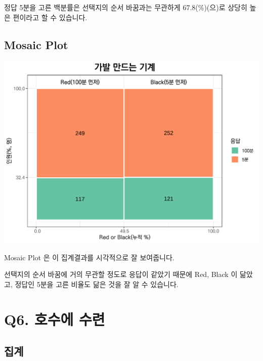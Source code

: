 \documentclass[
]{book}
\begin{document}
정답 5분을 고른 백분률은 선택지의 순서 바꿈과는 무관하게 67.8(\%)(으)로 상당히 높은 편이라고 할 수 있습니다.

\subsection{Mosaic Plot}\label{mosaic-plot-17}

\includegraphics{Quiz_report_2025_files/figure-latex/mosaic plot5-1.pdf}

Mosaic Plot 은 이 집계결과를 시각적으로 잘 보여줍니다.

선택지의 순서 바꿈에 거의 무관할 정도로 응답이 같았기 때문에 Red, Black 이 닮았고, 정답인 5분을 고른 비율도 닮은 것을 잘 알 수 있습니다.

\section{Q6. 호수에 수련}\label{q6.-uxd638uxc218uxc5d0-uxc218uxb828}

\subsection{집계}\label{uxc9d1uxacc4-24}
\end{document}
